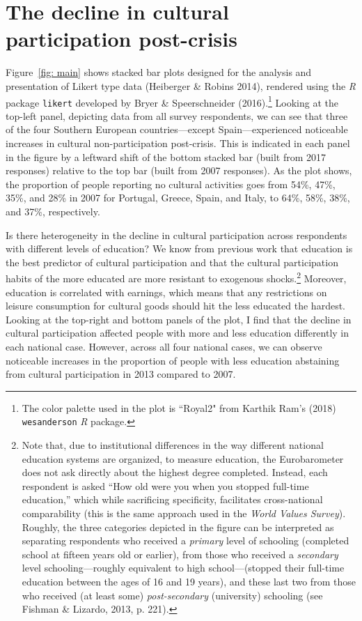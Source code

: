 \documentclass{article}
\begin{document}
\section{The decline in cultural participation post-crisis}
Figure~\ref{fig: main} shows stacked bar plots designed for the analysis and presentation of Likert type data (Heiberger \& Robins 2014), rendered using the {\em} {\em R} package \texttt{likert} developed by Bryer \& Speerschneider (2016).\footnote{The color palette used in the plot is ``Royal2" from Karthik Ram's (2018) \texttt{wesanderson} {\em R} package.}  Looking at the top-left panel, depicting data from all survey respondents, we can see that three of the four Southern European countries---except Spain---experienced noticeable increases in cultural non-participation post-crisis. This is indicated in each panel in the figure by a leftward shift of the bottom stacked bar (built from 2017 responses) relative to the top bar (built from 2007 responses). As the plot shows, the proportion of people reporting no cultural activities goes from 54\%, 47\%, 35\%, and 28\% in 2007 for Portugal, Greece, Spain, and Italy, to 64\%, 58\%, 38\%, and 37\%, respectively. 

Is there heterogeneity in the decline in cultural participation across respondents with different levels of education? We know from previous work that education is the best predictor of cultural participation and that the cultural participation habits of the more educated are more resistant to exogenous shocks.\footnote{Note that, due to institutional differences in the way different national education systems are organized, to measure education, the Eurobarometer does not ask directly about the highest degree completed. Instead, each respondent is asked ``How old were you when you stopped full-time education,'' which while sacrificing specificity, facilitates cross-national comparability (this is the same approach used in the \textit{World Values Survey}). Roughly, the three categories depicted in the figure can be interpreted as separating respondents who received a \textit{primary} level of schooling (completed school at fifteen years old or earlier), from those who received a \textit{secondary} level schooling---roughly equivalent to high school---(stopped their full-time education between the ages of 16 and 19 years), and these last two from those who received (at least some) \textit{post-secondary} (university) schooling (see Fishman \& Lizardo, 2013, p. 221).} Moreover, education is correlated with earnings, which means that any restrictions on leisure consumption for cultural goods should hit the less educated the hardest. Looking at the top-right and bottom panels of the plot, I find that the decline in cultural participation affected people with more and less education differently in each national case. However, across all four national cases, we can observe noticeable increases in the proportion of people with less education abstaining from cultural participation in 2013 compared to 2007.
\end{document}
